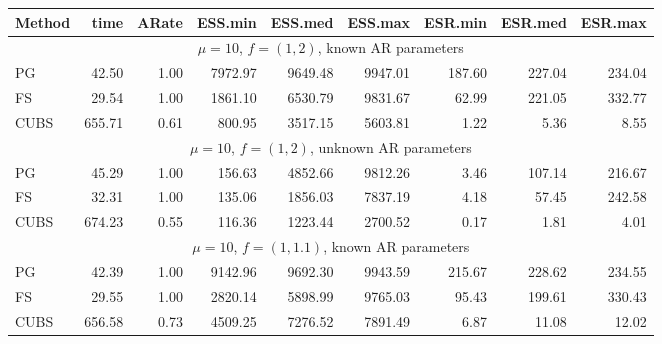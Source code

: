 \documentclass[11pt]{article}
\begin{document}
\begin{table}
\small
\centering
\begin{tabular}{l r r r r r r r r } 
Method  &    time  &   ARate  &  ESS.min  &  ESS.med  &  ESS.max  &  ESR.min  & ESR.med  &  ESR.max \\
\hline
\hline
 \multicolumn{9}{c}{$\mu=10$, $f = (1,2)$, known AR parameters} \\
\hline
             PG   &    42.50 &     1.00 &   7972.97 &   9649.48 &   9947.01 &    187.60 &    227.04 &    234.04 \\ 
             FS   &    29.54 &     1.00 &   1861.10 &   6530.79 &   9831.67 &     62.99 &    221.05 &    332.77 \\ 
           CUBS   &   655.71 &     0.61 &    800.95 &   3517.15 &   5603.81 &      1.22 &      5.36 &      8.55
 \\ %

\hline
 \multicolumn{9}{c}{$\mu=10$, $f = (1,2)$, unknown AR parameters} \\
\hline
             PG   &    45.29 &     1.00 &    156.63 &   4852.66 &   9812.26 &      3.46 &    107.14 &    216.67 \\ 
             FS   &    32.31 &     1.00 &    135.06 &   1856.03 &   7837.19 &      4.18 &     57.45 &    242.58 \\ 
           CUBS   &   674.23 &     0.55 &    116.36 &   1223.44 &   2700.52 &      0.17 &      1.81 &      4.01
 \\ %

\hline
 \multicolumn{9}{c}{$\mu=10$, $f = (1,1.1)$, known AR parameters} \\
\hline
            PG  &    42.39 &     1.00 &   9142.96 &   9692.30 &   9943.59 &    215.67 &    228.62 &    234.55 \\ 
            FS  &    29.55 &     1.00 &   2820.14 &   5898.99 &   9765.03 &     95.43 &    199.61 &    330.43 \\ 
          CUBS  &   656.58 &     0.73 &   4509.25 &   7276.52 &   7891.49 &      6.87 &     11.08 &     12.02


\end{tabular}
\end{table}
\end{document}
